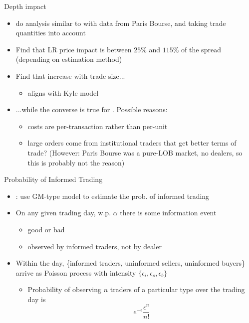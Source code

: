 \documentclass[english,10pt
,aspectratio=169
]{beamer}
\begin{document}
\begin{frame}{Depth impact}
	\begin{itemize}
		\item \textbf{\cite*{de_jong_price_1996}} do analysis similar to \cite{hasbrouck_measuring_1991} with data from Paris Bourse, and taking trade quantities into account
		\item Find that LR price impact is between $25\%$ and $115\%$ of the spread (depending on estimation method)
		\item Find that  \alert{increase with trade size}...
		\begin{itemize}
			\item aligns with Kyle model
		\end{itemize}
		\item ...while the \alert{converse} is true for . Possible reasons:
		\begin{itemize}
			\item costs are per-transaction rather than per-unit
			\item large orders come from institutional traders that get better terms of trade? (However: Paris Bourse was a pure-LOB market, no dealers, so this is probably not the reason)
		\end{itemize}
	\end{itemize}
\end{frame}


\begin{frame}{Probability of Informed Trading}
	\begin{itemize}
		\item \textbf{\citet*{easley_liquidity_1996}}: use GM-type model to estimate the prob. of informed trading
		\item On any given trading day, w.p. $\alpha$ there is some information event
		\begin{itemize}
			\item good or bad
			\item observed by informed traders, not by dealer
		\end{itemize}
		\item Within the day, \{informed traders, uninformed sellers, uninformed buyers\} arrive as Poisson process with intensity $\{\epsilon_i, \epsilon_s, \epsilon_b \}$
		\begin{itemize}
			\item Probability of observing $n$ traders of a particular type over the trading day is
			\[
			e^{-\epsilon} \frac{\epsilon^n}{n!}
			\]
		\end{itemize}
	\end{itemize}
\end{frame}
\end{document}
